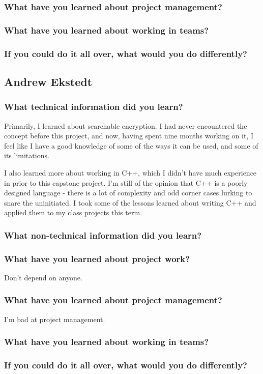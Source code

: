 \subsubsection{What have you learned about project management?}
\subsubsection{What have you learned about working in teams?}
\subsubsection{If you could do it all over, what would you do differently?}

\subsection{Andrew Ekstedt}
\subsubsection{What technical information did you learn?}

Primarily, I learned about searchable encryption. I had never encountered the concept before this project, and now, having spent nine months working on it, I feel like I have a good knowledge of some of the ways it can be used, and some of its limitations. 

I also learned more about working in C++, which I didn't have much experience in prior to this capstone project. I'm still of the opinion that C++ is a poorly designed language - there is a lot of complexity and odd corner cases lurking to snare the uninitiated. I took some of the lessons learned about writing C++ and applied them to my class projects this term.

\subsubsection{What non-technical information did you learn?}


\subsubsection{What have you learned about project work?}
Don't depend on anyone.

\subsubsection{What have you learned about project management?}
I'm bad at project management.

\subsubsection{What have you learned about working in teams?}


\subsubsection{If you could do it all over, what would you do differently?}
